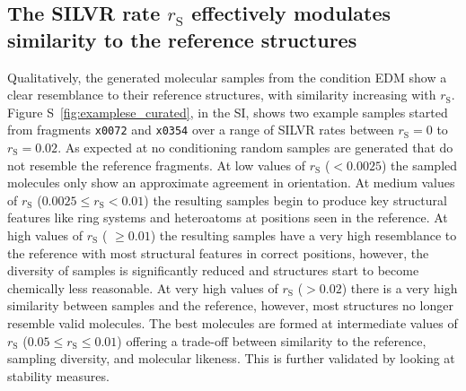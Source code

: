 \documentclass[journal=jacsat,manuscript=article]{achemso}
\begin{document}
\subsection{The SILVR rate $r_{\mathrm{S}}$ effectively modulates similarity to the reference structures}
Qualitatively, the generated molecular samples from the condition EDM  show a clear resemblance to their reference structures, with similarity increasing with $r_{\mathrm{S}}$. Figure S~\ref{fig:examplese_curated}, in the SI, shows two example samples started from fragments \texttt{x0072} and \texttt{x0354} over a range of SILVR rates between $r_{\mathrm{S}}=0$ to $r_{\mathrm{S}}=0.02$. As expected at no conditioning random samples are generated that do not resemble the reference fragments.  At low values of $r_{\mathrm{S}}$ ($< 0.0025$) the sampled molecules only show an approximate agreement in orientation. At medium values of $r_{\mathrm{S}}$ ($0.0025 \le r_{\mathrm{S}} < 0.01$) the resulting samples begin to produce key structural features like ring systems and heteroatoms at positions seen in the reference. At high values of $r_{\mathrm{S}}$ ( $\ge 0.01$) the resulting samples have a very high resemblance to the reference with most structural features in correct positions, however, the diversity of samples is significantly reduced and structures start to become chemically less reasonable. At very high values of $r_{\mathrm{S}}$ ($> 0.02$) there is a very high similarity between samples and the reference, however, most structures no longer resemble valid molecules. The best molecules are formed at intermediate values of $r_{\mathrm{S}}$ ($0.05 \le r_{\mathrm{S}} \le 0.01$) offering a trade-off between similarity to the reference, sampling diversity, and molecular likeness. This is further validated by looking at stability measures. 
\end{document}
